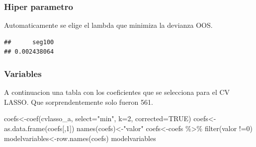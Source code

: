\documentclass[
]{article}
\newenvironment{Shaded}{\begin{snugshade}}{\end{snugshade}}
\newcommand{\AttributeTok}[1]{\textcolor[rgb]{0.77,0.63,0.00}{#1}}
\newcommand{\CommentTok}[1]{\textcolor[rgb]{0.56,0.35,0.01}{\textit{#1}}}
\newcommand{\ConstantTok}[1]{\textcolor[rgb]{0.00,0.00,0.00}{#1}}
\newcommand{\DecValTok}[1]{\textcolor[rgb]{0.00,0.00,0.81}{#1}}
\newcommand{\FunctionTok}[1]{\textcolor[rgb]{0.00,0.00,0.00}{#1}}
\newcommand{\NormalTok}[1]{#1}
\newcommand{\OtherTok}[1]{\textcolor[rgb]{0.56,0.35,0.01}{#1}}
\newcommand{\SpecialCharTok}[1]{\textcolor[rgb]{0.00,0.00,0.00}{#1}}
\newcommand{\StringTok}[1]{\textcolor[rgb]{0.31,0.60,0.02}{#1}}
\begin{document}
\hypertarget{hiper-parametro}{%
\subsubsection{Hiper parametro}\label{hiper-parametro}}

Automaticamente se elige el lambda que minimiza la devianza OOS.

\begin{Shaded}
\end{Shaded}

\begin{verbatim}
##      seg100 
## 0.002438064
\end{verbatim}

\hypertarget{variables}{%
\subsubsection{Variables}\label{variables}}

A continuacion una tabla con los coeficientes que se selecciona para el
CV LASSO. Que sorprendentemente solo fueron 561.

\begin{Shaded}
\begin{Highlighting}[]
\NormalTok{coefs}\OtherTok{\textless{}{-}}\FunctionTok{coef}\NormalTok{(cvlasso\_a, }\AttributeTok{select=}\StringTok{"min"}\NormalTok{, }\AttributeTok{k=}\DecValTok{2}\NormalTok{, }\AttributeTok{corrected=}\ConstantTok{TRUE}\NormalTok{)}
\NormalTok{coefs}\OtherTok{\textless{}{-}}\FunctionTok{as.data.frame}\NormalTok{(coefs[,}\DecValTok{1}\NormalTok{])}
\FunctionTok{names}\NormalTok{(coefs)}\OtherTok{\textless{}{-}}\StringTok{"valor"}
\NormalTok{coefs}\OtherTok{\textless{}{-}}\NormalTok{coefs }\SpecialCharTok{\%\textgreater{}\%} \FunctionTok{filter}\NormalTok{(valor }\SpecialCharTok{!=}\DecValTok{0}\NormalTok{)}
\NormalTok{modelvariables}\OtherTok{\textless{}{-}}\FunctionTok{row.names}\NormalTok{(coefs)}
\NormalTok{modelvariables}
\end{Highlighting}
\end{Shaded}
\end{document}
